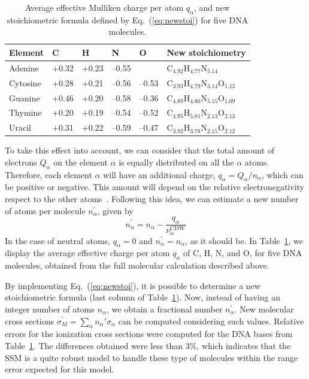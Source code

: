 \documentclass[10pt,showpacs,showkeys,twocolumn]{revtex4}
\begin{document}
\begin{table}[t]
\begin{center}
\begin{tabular}{|p{}|p{}|p{}|p{
}|p{}|p{}|}
\hline
Element & C & H & N & O & New stoichiometry \\
\hline
Adenine & +0.32 & +0.23 & --0.55 &       & 
C$_{4.92}$H$_{4.77}$N$_{5.14}$ \\ 
\hline
Cytosine & +0.28 & +0.21 & --0.56 & --0.53 & 
C$_{3.93}$H$_{4.79}$N$_{3.14}$O$_{1.13}$ \\ 
\hline
Guanine & +0.46 & +0.20 & --0.58 & --0.36 & 
C$_{4.89}$H$_{4.80}$N$_{5.15}$O$_{1.09}$ \\ 
\hline
Thymine & +0.20 & +0.19 & --0.54 & --0.52 & 
C$_{4.95}$H$_{5.81}$N$_{2.13}$O$_{2.13}$ \\ 
\hline
Uracil & +0.31 & +0.22 & --0.59 & --0.47 & 
C$_{3.92}$H$_{3.78}$N$_{2.15}$O$_{2.12}$ \\ 
\hline
\end{tabular}
\caption{Average effective Mulliken charge per atom $q_{\alpha}$, and 
new stoichiometric formula defined by Eq.~(\ref{eq:newstoi}) for five 
DNA molecules.}
\label{tab:newstoi}
\end{center}
\end{table}

To take this effect into account, we can consider that the total amount 
of electrons $Q_{\alpha }$ on the element
$\alpha$ is equally distributed on all the $\alpha$ atoms. Therefore, 
each element $\alpha$ will have an additional charge, 
$q_{\alpha}=Q_{\alpha}/n_{\alpha}$, which can be positive or negative.
This amount will depend on the relative electronegativity respect to 
the other atoms~\cite{rappe1991}. 
Following this idea, we can estimate a new number of atoms per molecule
$n_{\alpha }^{\prime }$, given by
\begin{equation}
n_{\alpha }^{\prime }=n_{\alpha }-
\frac{q_{\alpha }}{\nu_{\alpha }^{\text{CDW}}}
\label{eq:newstoi}
\end{equation}%
In the case of neutral atoms, $q_{\alpha}=0$ and 
$n_{\alpha}^{\prime}=n_{\alpha}$, as it should be. 
In Table~\ref{tab:newstoi}, we display the average effective charge 
per atom $q_{\alpha}$ of C, H, N, and O, for five DNA molecules,
obtained from the full molecular calculation described 
above.

By implementing Eq.~(\ref{eq:newstoi}), it is possible to determine a 
new stoichiometric formula (last column of Table~\ref{tab:newstoi}). 
Now, instead of having an integer number of atoms $n_{\alpha}$, we obtain 
a fractional number $n_{\alpha}^{\prime}$. New molecular cross sections 
$\sigma^{\prime}_{M}=\sum_{\alpha}n_{\alpha}'\sigma_{\alpha}$ can be 
computed considering 
such values. Relative errors for the ionization cross sections were 
computed for the DNA bases from Table~\ref{tab:newstoi}. The differences 
obtained were less than 3\%, which indicates that the  
SSM is a quite robust model to handle these type of molecules within 
the range error expected for this model.
\end{document}
